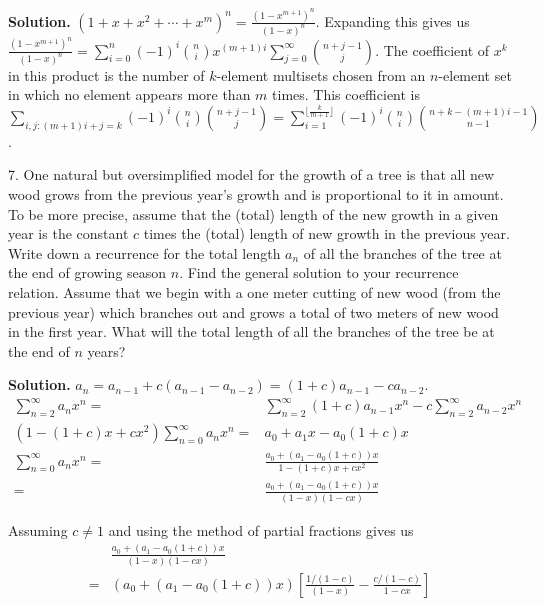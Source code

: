\documentclass[10pt,]{book}
\theoremstyle{plain}
\theoremstyle{definition}
\theoremstyle{definition}
\numberwithin{equation}{chapter}
\newcommand{\amp}{&}
\begin{document}
\begin{exerciselist}
\par\smallskip
\par\smallskip
\noindent\textbf{Solution.}\hypertarget{solution-363}{}\quad
\((1+x+x^2+\cdots+x^m)^n=\frac{(1-x^{m+1})^n}{(1-x)^n}\).  Expanding this gives us \(\frac{(1-x^{m+1})^n}{(1-x)^n}=\sum_{i=0}^n(-1)^i \binom{n}{i}x^{(m+1)i} \sum_{j=0}^\infty \binom{n+j-1}{j}\). The coefficient of \(x^k\) in this product is the number of \(k\)-element multisets chosen from an \(n\)-element set in which no element appears more than \(m\) times. This coefficient is \(\sum\limits_{i,j:(m+1)i+j=k}(-1)^i\binom{n}{i}\binom{n+j-1}{j}=\sum\limits_{i=1}^{\lfloor\frac{k}{m+1}\rfloor}(-1)^i\binom{n}{i}\binom{n+k-(m+1)i-1}{n-1}\).%
\item[7.]\hypertarget{exercise-43}{}One natural but oversimplified model for the growth of a tree is that all new wood grows from the previous year's growth and is proportional to it in amount. To be more precise, assume that the (total) length of the new growth in a given year is the constant \(c\) times the (total) length of new growth in the previous year. Write down a recurrence for the total length \(a_n\) of all the branches of the tree at the end of growing season \(n\). Find the general solution to your recurrence relation. Assume that we begin with a one meter cutting of new wood (from the previous year) which branches out and grows a total of two meters of new wood in the first year.  What will the total length of all the branches of the tree be at the end of \(n\) years?%
\par\smallskip
\par\smallskip
\noindent\textbf{Solution.}\hypertarget{solution-364}{}\quad
\(a_n= a_{n-1} +c(a_{n-1}-a_{n-2})=(1+c)a_{n-1}-ca_{n-2}\).%
\begin{align*}
\sum_{n=2}^\infty
a_nx^n =\amp \sum_{n=2}^\infty(1+c)a_{n-1}x^n-c\sum_{n=2}^\infty a_{n-2}x^n\\
(1-(1+c)x +cx^2)\sum_{n=0}^\infty a_nx^n =\amp a_0+a_1x-a_0(1+c)x\\
\sum_{n=0}^\infty a_nx^n  =\amp  \frac{a_0+(a_1-a_0(1+c))x}{1-(1+c)x +cx^2}\\
=\amp  \frac{a_0+(a_1-a_0(1+c))x}{(1-x)(1-cx)}
\end{align*}
%
\par
Assuming \(c\not=1\) and using the method of partial fractions gives us%
\begin{align*}
\amp \frac{a_0+(a_1-a_0(1+c))x}{(1-x)(1-cx)}\\
=\amp  (a_0+(a_1-a_0(1+c))x)
\left[\frac{1/(1-c)}{(1-x)} -\frac{c/(1-c)}{1-cx}\right]\\

\end{align*}
\end{exerciselist}
\end{document}
